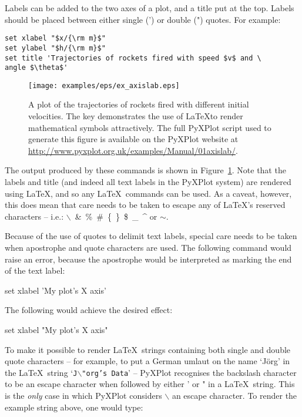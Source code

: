 Labels can be added to the two axes of a plot, and a title put at the top.
Labels should be placed between either single (') or double (") quotes.  For
example:

\begin{verbatim}
set xlabel "$x/{\rm m}$"
set ylabel "$h/{\rm m}$"
set title 'Trajectories of rockets fired with speed $v$ and \
angle $\theta$'
\end{verbatim}

\begin{figure}
\begin{center}
\texttt{[image: examples/eps/ex\_axislab.eps]}
\end{center}
\caption{A plot of the trajectories of rockets fired with different initial
velocities.  The key demonstrates the use of \LaTeX to render mathematical
symbols attractively.  The full PyXPlot script used to generate this figure is
available on the PyXPlot website at
\protect\url{http://www.pyxplot.org.uk/examples/Manual/01axislab/}.}
\label{fig:ex_axislab}
\end{figure}

\noindent The output produced by these commands is shown in
Figure~\ref{fig:ex_axislab}.  Note that the labels and title (and indeed all
text labels in the PyXPlot system) are rendered using \LaTeX, and so any
\LaTeX\ commands can be used.  As a caveat, however, this does mean that care
needs to be taken to escape any of \LaTeX's reserved characters -- i.e.:
$\backslash$~\&~\%~\#~\{~\}~\$~\_~\^{} or $\sim$.

Because of the use of quotes to delimit text labels, special care needs to be
taken when apostrophe and quote characters are used. The following command
would raise an error, because the apostrophe would be interpreted as marking
the end of the text label:

\begin{dontdo}
set xlabel 'My plot's X axis'
\end{dontdo}

\noindent The following would achieve the desired effect:

\begin{dodo}
set xlabel "My plot's X axis"
\end{dodo}

To make it possible to render \LaTeX\ strings containing both single and double
quote characters -- for example, to put a German umlaut on the name `J\"org' in
the \LaTeX\ string `{\tt J$\backslash$"org's Data}' -- PyXPlot recognises
the backslash character to be an escape character when followed by either ' or
" in a \LaTeX\ string. This is the \textit{only} case in which PyXPlot
considers $\backslash$ an escape character. To render the example string above,
one would type:\index{escape characters}

